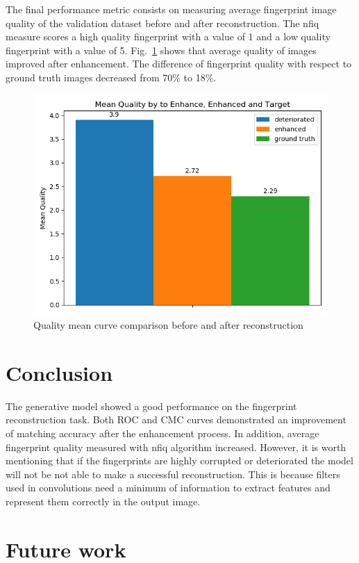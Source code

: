\documentclass[a4paper,fleqn]{cas-dc}
\begin{document}
The final performance metric consists on measuring average fingerprint image quality of the validation dataset before and after reconstruction. The nfiq measure scores a high quality fingerprint with a value of 1 and a low quality fingerprint with a value of 5. Fig.~\ref{fig11} shows that average quality of images improved after enhancement. The difference of fingerprint quality with respect to ground truth images decreased from 70\% to 18\%.

\begin{figure}[htbp]
\centerline{\includegraphics[scale=0.4]{figs/mean_qualities.png}}
\caption{Quality mean curve comparison before and after reconstruction}
\label{fig11}
\end{figure}

\section{Conclusion}
\label{sec:CON}

The generative model showed a good performance on the fingerprint reconstruction task. Both ROC and CMC curves demonstrated an improvement of matching accuracy after the enhancement process. In addition, average fingerprint quality measured with nfiq algorithm increased. However, it is worth mentioning that if the fingerprints are highly corrupted or deteriorated the model will not be not able to make a successful reconstruction. This is because filters used in convolutions need a minimum of information to extract features and represent them correctly in the output image.


\section{Future work}
\label{sec:FW}
\end{document}
